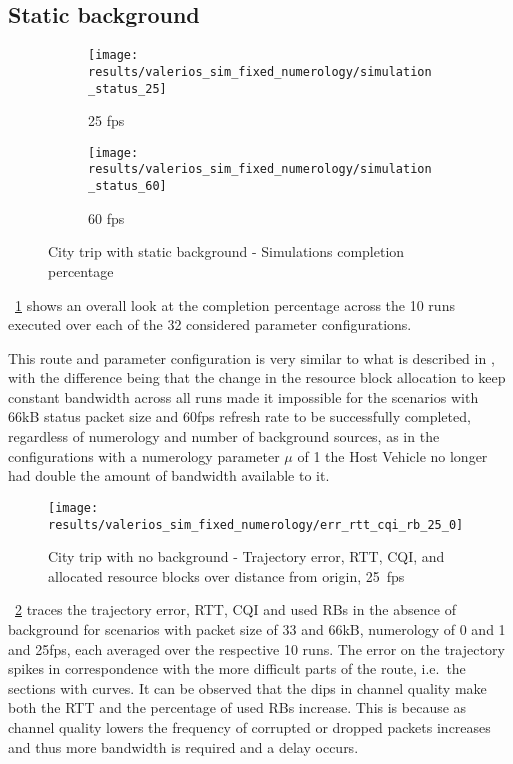 \subsection{Static background}

\begin{figure}[H]
    \centering
    \begin{subfigure}[b]{0.95\textwidth}
        \centering
        \texttt{[image: results/valerios\_sim\_fixed\_numerology/simulation\_status\_25]}
        \caption{25 fps}
    \end{subfigure}
    \hfill
    \begin{subfigure}[b]{0.95\textwidth}
        \centering
        \texttt{[image: results/valerios\_sim\_fixed\_numerology/simulation\_status\_60]}
        \caption{60 fps}
    \end{subfigure}
    \caption{City trip with static background - Simulations completion percentage}
    \label{fig:valerios_sim_fixed_numerology_completion_percentage}
\end{figure}

\figurename~\ref{fig:valerios_sim_fixed_numerology_completion_percentage} shows an overall look at the completion percentage across the 10 runs executed over each of the 32 considered parameter configurations.


This route and parameter configuration is very similar to what is described in \cite{valeriopaper}, with the difference being that the change in the resource block allocation to keep constant bandwidth across all runs made it impossible for the scenarios with 66kB status packet size and 60fps refresh rate to be successfully completed, regardless of numerology and number of background sources, as in the configurations with a numerology parameter $\mu$ of 1 the Host Vehicle no longer had double the amount of bandwidth available to it.

\begin{figure}[H]
    \centering
    \texttt{[image: results/valerios\_sim\_fixed\_numerology/err\_rtt\_cqi\_rb\_25\_0]}
    \caption{City trip with no background - Trajectory error, RTT, CQI, and allocated resource blocks over distance from origin, 25~fps}
    \label{fig:valerios_sim_fixed_numerology_err_rtt_cqi_rb_25_0}
\end{figure}

\figurename~\ref{fig:valerios_sim_fixed_numerology_err_rtt_cqi_rb_25_0} traces the trajectory error, RTT, CQI and used RBs in the absence of background for scenarios with packet size of 33 and 66kB, numerology of 0 and 1 and 25fps, each averaged over the respective 10 runs. The error on the trajectory spikes in correspondence with the more difficult parts of the route, i.e.\ the sections with curves.
It can be observed that the dips in channel quality make both the RTT and the percentage of used RBs increase. This is because as channel quality lowers the frequency of corrupted or dropped packets increases and thus more bandwidth is required and a delay occurs.

